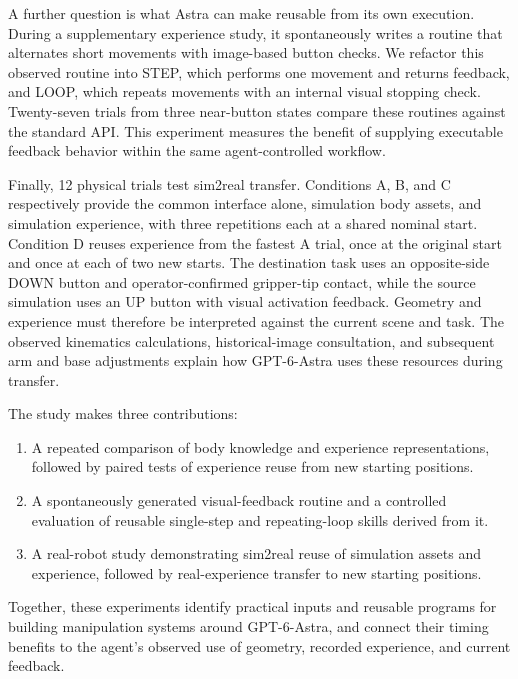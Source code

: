 \documentclass[11pt]{article}
\begin{document}
A further question is what Astra can make reusable from its own execution. During a supplementary experience study, it spontaneously writes a routine that alternates short movements with image-based button checks. We refactor this observed routine into STEP, which performs one movement and returns feedback, and LOOP, which repeats movements with an internal visual stopping check. Twenty-seven trials from three near-button states compare these routines against the standard API. This experiment measures the benefit of supplying executable feedback behavior within the same agent-controlled workflow.

Finally, 12 physical trials test sim2real transfer. Conditions A, B, and C respectively provide the common interface alone, simulation body assets, and simulation experience, with three repetitions each at a shared nominal start. Condition D reuses experience from the fastest A trial, once at the original start and once at each of two new starts. The destination task uses an opposite-side DOWN button and operator-confirmed gripper-tip contact, while the source simulation uses an UP button with visual activation feedback. Geometry and experience must therefore be interpreted against the current scene and task. The observed kinematics calculations, historical-image consultation, and subsequent arm and base adjustments explain how GPT-6-Astra uses these resources during transfer.

\begin{samepage}
The study makes three contributions:
\begin{enumerate}
\item A repeated comparison of body knowledge and experience representations, followed by paired tests of experience reuse from new starting positions.
\item A spontaneously generated visual-feedback routine and a controlled evaluation of reusable single-step and repeating-loop skills derived from it.
\item A real-robot study demonstrating sim2real reuse of simulation assets and experience, followed by real-experience transfer to new starting positions.
\end{enumerate}
Together, these experiments identify practical inputs and reusable programs for building manipulation systems around GPT-6-Astra, and connect their timing benefits to the agent's observed use of geometry, recorded experience, and current feedback.
\end{samepage}
\end{document}
